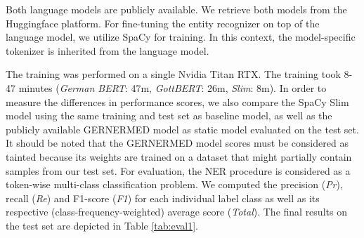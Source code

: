 \documentclass[runningheads]{llncs}
\begin{document}
Both language models are publicly available. We retrieve both models from the Huggingface platform. For fine-tuning the entity recognizer on top of the language model, we utilize SpaCy for training. In this context, the model-specific tokenizer is inherited from the language model.

The training was performed on a single Nvidia Titan RTX. The training took 8-47 minutes (\textit{German BERT}: 47m, \textit{GottBERT}: 26m, \textit{Slim}: 8m).
In order to measure the differences in performance scores, we also compare the SpaCy Slim model using the same training and test set as baseline model, as well as the publicly available GERNERMED model as static model evaluated on the test set. It should be noted that the GERNERMED model scores must be considered as tainted because its weights are trained on a dataset that might partially contain samples from our test set. For evaluation, the NER procedure is considered as a token-wise multi-class classification problem. We computed the precision (\textit{Pr}), recall (\textit{Re}) and F1-score (\textit{F1}) for each individual label class as well as its respective (class-frequency-weighted) average score (\textit{Total}).
The final results on the test set are depicted in Table \ref{tab:eval1}.
\end{document}
